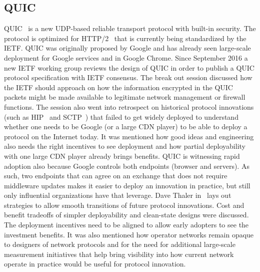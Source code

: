 \subsection{QUIC}

QUIC~\cite{draft-ietf-quic-transport} is a new UDP-based reliable transport
protocol with built-in security. The protocol is optimized for HTTP/2~\cite{rfc7540} that is currently being standardized by the \ac{IETF}. QUIC was
originally proposed by Google and has already seen large-scale deployment for
Google services and in Google Chrome. Since September 2016 a new IETF working
group reviews the design of QUIC in order to publish a QUIC protocol
specification with \ac{IETF} consensus. The break out session discussed how
the \ac{IETF} should approach on how the information encrypted in the QUIC
packets might be made available to legitimate network management or firewall
functions. The session also went into retrospect on historical protocol
innovations (such as HIP~\cite{pnikander:comst:2010} and SCTP~\cite{rfc4960})
that failed to get widely deployed to understand whether one needs to be
Google (or a large CDN player) to be able to deploy a protocol on the Internet
today. It was mentioned how good ideas and engineering also needs the right
incentives to see deployment and how partial deployability with one large CDN
player already brings benefits. QUIC is witnessing rapid adoption also because
Google controls both endpoints (browser and servers). As such, two endpoints
that can agree on an exchange that does not require middleware updates makes
it easier to deploy an innovation in practice, but still only influential
organizations have that leverage. Dave Thaler in~\cite{draft-iab-protocol-transitions} lays out strategies to allow smooth
transitions of future protocol innovations. Cost and benefit tradeoffs of
simpler deployability and clean-state designs were discussed. The deployment
incentives need to be aligned to allow early adopters to see the investment
benefits. It was also mentioned how operator networks remain opaque to
designers of network protocols and for the need for additional large-scale
measurement initiatives that help bring visibility into how current network
operate in practice would be useful for protocol innovation.




